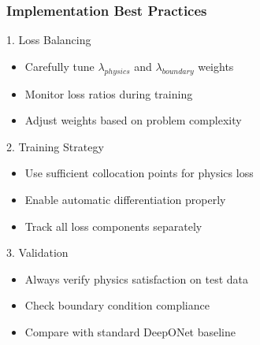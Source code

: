 \documentclass[notes]{beamer}
\begin{document}
\begin{frame}
\frametitle{Implementation Best Practices}

\begin{block}{1. Loss Balancing}
\begin{itemize}
    \item Carefully tune $\lambda_{physics}$ and $\lambda_{boundary}$ weights
    \item Monitor loss ratios during training
    \item Adjust weights based on problem complexity
\end{itemize}
\end{block}

\begin{block}{2. Training Strategy}
\begin{itemize}
    \item Use sufficient collocation points for physics loss
    \item Enable automatic differentiation properly
    \item Track all loss components separately
\end{itemize}
\end{block}

\begin{block}{3. Validation}
\begin{itemize}
    \item Always verify physics satisfaction on test data
    \item Check boundary condition compliance
    \item Compare with standard DeepONet baseline
\end{itemize}
\end{block}

\end{frame}
\end{document}
